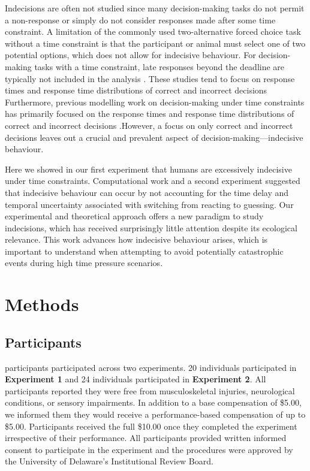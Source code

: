 \documentclass[man,donotrepeattitle,floatsintext,letterpaper,12pt]{apa7}
\newcommand\boldblue[1]{\textcolor{mydarkblue}{\textbf{#1}}}
\begin{document}
Indecisions are often not studied since many decision-making tasks do not permit a non-response or simply do not consider responses made after some time constraint. A limitation of the commonly used two-alternative forced choice task without a time constraint is that the participant or animal must select one of two potential options, which does not allow for indecisive behaviour. For decision-making tasks with a time constraint, late responses beyond the deadline are typically not included in the analysis \autocite{forstmannStriatumPreSMAFacilitate2008,diederichFurtherTestSequentialsampling2008,wuCapacityCognitiveControl2016,dambacherTimePressureAffects2015}. These studies tend to focus on  response times and response time distributions of correct and incorrect decisions Furthermore, previous modelling work on decision-making under time constraints has primarily focused on the response times and response time distributions of correct and incorrect decisions \autocite{karsilarSpeedAccuracyTradeoff2014,farashahiDynamicCombinationSensory2018}.However, a focus on only correct and incorrect decisions leaves out a crucial and prevalent aspect of decision-making—indecisive behaviour.

Here we showed in our first experiment that humans are excessively indecisive under time constraints. Computational work and a second experiment suggested that indecisive behaviour can occur by not accounting for the time delay and temporal uncertainty associated with switching from reacting to guessing. Our experimental and theoretical approach offers a new paradigm to study indecisions, which has received surprisingly little attention despite its ecological relevance. This work advances how indecisive behaviour arises, which is important to understand when attempting to avoid potentially catastrophic events during high time pressure scenarios.

\newpage
\section{Methods}

\subsection{Participants}

 participants participated across two experiments. 20 individuals participated in \boldblue{Experiment 1} and 24 individuals participated in \boldblue{Experiment 2}. All participants reported they were free from musculoskeletal injuries, neurological conditions, or sensory impairments. In addition to a base compensation of \$5.00, we informed them they would receive a performance-based compensation of up to \$5.00. Participants received the full \$10.00 once they completed the experiment irrespective of their performance. All participants provided written informed consent to participate in the experiment and the procedures were approved by the University of Delaware’s Institutional Review Board.
\end{document}
